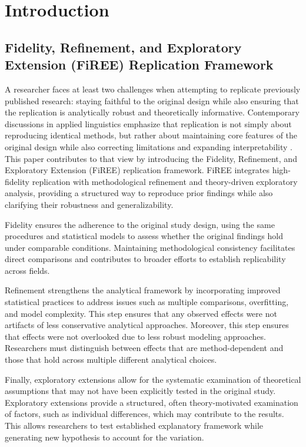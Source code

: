 \section{Introduction}
\subsection{Fidelity, Refinement, and Exploratory Extension (FiREE) Replication Framework}

A researcher faces at least two challenges when attempting to replicate previously published research: staying faithful to the original design while also ensuring that the replication is analytically robust and theoretically informative. Contemporary discussions in applied linguistics emphasize that replication is not simply about reproducing identical methods, but rather about maintaining core features of the original design while also correcting limitations and expanding interpretability \parencite{marsden2018,mcmanus2024,porte2018}. This paper contributes to that view by introducing the Fidelity, Refinement, and Exploratory Extension (FiREE) replication framework. FiREE integrates high-fidelity replication with methodological refinement and theory-driven exploratory analysis, providing a structured way to reproduce prior findings while also clarifying their robustness and generalizability.

Fidelity ensures the adherence to the original study design, using the same procedures and statistical models to assess whether the original findings hold under comparable conditions. Maintaining methodological consistency facilitates direct comparisons and contributes to broader efforts to establish replicability across fields. 

Refinement strengthens the analytical framework by incorporating improved statistical practices to address issues such as multiple comparisons, overfitting, and model complexity. This step ensures that any observed effects were not artifacts of less conservative analytical approaches. Moreover, this step ensures that effects were not overlooked due to less robust modeling approaches. Researchers must distinguish between effects that are method-dependent and those that hold across multiple different analytical choices.

Finally, exploratory extensions allow for the systematic examination of theoretical assumptions that may not have been explicitly tested in the original study. Exploratory extensions provide a structured, often theory-motivated examination of factors, such as individual differences, which may contribute to the results. This allows researchers to test established explanatory framework while generating new hypothesis to account for the variation. 

